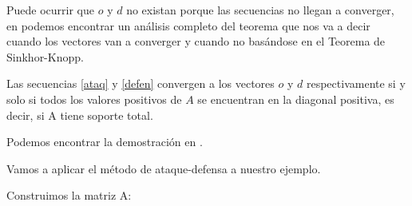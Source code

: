 Puede ocurrir que $o$ y $d$ no existan porque las secuencias no llegan a converger, en \cite[pág 87-90]{cap7} podemos encontrar un análisis completo del teorema que nos va a decir cuando los vectores van a converger y cuando no basándose en el Teorema de Sinkhor-Knopp.
\begin{teo}
	Las secuencias \ref{ataq} y \ref{defen} convergen a los vectores $o$ y $d$ respectivamente si y solo si todos los valores positivos de $A$ se encuentran en la diagonal positiva, es decir, si A tiene soporte total. 
\end{teo}
Podemos encontrar la demostración en \cite[pág 90-91]{cap7}.\\
    
\begin{ejem} Vamos a aplicar el método de ataque-defensa a nuestro ejemplo.\\
\end{ejem}	
	Construimos la matriz A:

